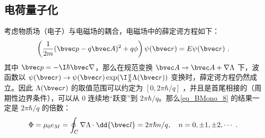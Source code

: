 \subsection{电荷量子化}
考虑物质场（电子）与电磁场的耦合，电磁场中的薛定谔方程如下：
\begin{equation}
\left(\frac{1}{2m}(\bvec p-q\bvec A)^2 +q\phi\right)\psi(\bvec r) = E\psi(\bvec r)~.
\end{equation}
其中 $\bvec p=-\I\hbar\bvec \nabla$，那么在规范变换 $\bvec A\rightarrow \bvec A+\nabla \Lambda$ 下，波函数以 $\psi(\bvec r)\rightarrow \psi(\bvec r)\exp(\I\frac{q}{\hbar}\Lambda(\bvec r))$ 变换时，薛定谔方程仍然成立。因此 $\Lambda(\bvec r)$ 的取值范围可以约定为 $[0,2\pi \hbar/q]$ ，并且是首尾相接的（周期性边界条件），可以从 $0$ 连续地“跃变”到 $2\pi \hbar/q$。那么\autoref{eq_BMono_8} 的结果一定是 $2\pi \hbar/q$ 的倍数：
\begin{equation}
\Phi = \mu_0 e_M=\oint_C \nabla\Lambda\cdot \dd{\bvec l} = 2\pi \hbar n/q,\quad n=0,\pm 1,\pm 2,\cdots ~.
\end{equation}

